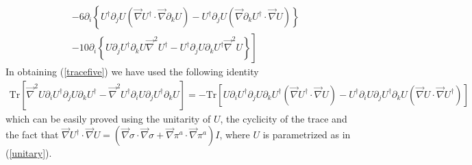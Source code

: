 \documentclass[a4paper,prd,showpacs,showkeys]{revtex4}
\begin{document}
{{\begin{eqnarray}
& & -6 \partial_i \left \{ U^{\dagger} \partial_j U (\vec{\nabla}U^{\dagger} \cdot \vec{\nabla}\partial_k U)-U^{\dagger} \partial_j U (\vec{\nabla}\partial_k U^{\dagger} \cdot \vec{\nabla}U) \right \} \nonumber \\
& & -10 \left. \partial_i \left \{U \partial_j U^{\dagger} \partial_k U \vec{\nabla}^2 U^{\dagger}- U^{\dagger} \partial_j U \partial_k U^{\dagger} \vec{\nabla}^2 U\right \} \right]
\label{tracefive}
\end{eqnarray}
In obtaining (\ref{tracefive}) we have used the following identity
\begin{eqnarray}
 \textrm{Tr}\left[\vec{\nabla}^2 U \partial_iU^{\dagger} \partial_j U \partial_k U^{\dagger}-\vec{\nabla}^2 U^{\dagger} \partial_i U \partial_j U^{\dagger} \partial_k U\right] =
 -\textrm{Tr}\left[U \partial_i U^{\dagger} \partial_j U \partial_k U^{\dagger}(\vec{\nabla}U^{\dagger} \cdot \vec{\nabla}U)-U^{\dagger} \partial_i U \partial_j U^{\dagger} \partial_k U (\vec{\nabla}U \cdot \vec{\nabla}U^{\dagger})\right]
\nonumber
\end{eqnarray}
which can be easily proved using the unitarity of $U$, the cyclicity of the trace and the fact that $\vec{\nabla}U^{\dagger} \cdot \vec{\nabla}U=(\vec{\nabla} \sigma \cdot \vec{\nabla} \sigma + \vec{\nabla} \pi ^{a} \cdot \vec{\nabla} \pi ^{a}) I$, where $U$ is parametrized as in (\ref{unitary}). 

}}
\end{document}
